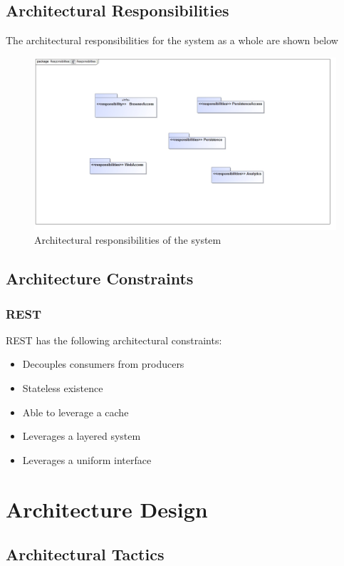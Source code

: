 \documentclass{article}
\begin{document}
\subsection{Architectural Responsibilities}
The architectural responsibilities for the system as a whole are shown below
\begin{figure}[H]
	\centering
	\includegraphics[width=\textwidth]{Responsibilities.jpg}
	\caption{Architectural responsibilities of the system}
\end{figure}
\clearpage
\subsection{Architecture Constraints}
\subsubsection{REST}
	REST has the following architectural constraints:
	\begin{itemize}
		\item Decouples consumers from producers
		\item Stateless existence
		\item Able to leverage a cache
		\item Leverages a layered system
		\item Leverages a uniform interface
	\end{itemize}

\cleardoublepage

\section{Architecture Design}
\subsection{Architectural Tactics}
\end{document}
